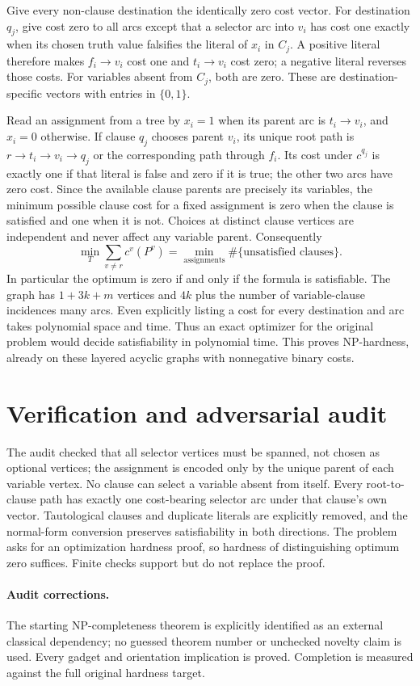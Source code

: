 \documentclass[11pt]{article}
\begin{document}
Give every non-clause destination the identically zero cost vector. For destination $q_j$, give cost zero to all arcs except that a selector arc into $v_i$ has cost one exactly when its chosen truth value falsifies the literal of $x_i$ in $C_j$. A positive literal therefore makes $f_i\to v_i$ cost one and $t_i\to v_i$ cost zero; a negative literal reverses those costs. For variables absent from $C_j$, both are zero. These are destination-specific vectors with entries in $\{0,1\}$.

Read an assignment from a tree by $x_i=1$ when its parent arc is $t_i\to v_i$, and $x_i=0$ otherwise. If clause $q_j$ chooses parent $v_i$, its unique root path is $r\to t_i\to v_i\to q_j$ or the corresponding path through $f_i$. Its cost under $c^{q_j}$ is exactly one if that literal is false and zero if it is true; the other two arcs have zero cost. Since the available clause parents are precisely its variables, the minimum possible clause cost for a fixed assignment is zero when the clause is satisfied and one when it is not. Choices at distinct clause vertices are independent and never affect any variable parent. Consequently
\[
\min_T\sum_{v\ne r}c^v(P^v)
=\min_{\text{assignments}}\#\{\text{unsatisfied clauses}\}.
\]
In particular the optimum is zero if and only if the formula is satisfiable. The graph has $1+3k+m$ vertices and $4k$ plus the number of variable-clause incidences many arcs. Even explicitly listing a cost for every destination and arc takes polynomial space and time. Thus an exact optimizer for the original problem would decide satisfiability in polynomial time. This proves NP-hardness, already on these layered acyclic graphs with nonnegative binary costs.

\section{Verification and adversarial audit}
The audit checked that all selector vertices must be spanned, not chosen as optional vertices; the assignment is encoded only by the unique parent of each variable vertex. No clause can select a variable absent from itself. Every root-to-clause path has exactly one cost-bearing selector arc under that clause's own vector. Tautological clauses and duplicate literals are explicitly removed, and the normal-form conversion preserves satisfiability in both directions. The problem asks for an optimization hardness proof, so hardness of distinguishing optimum zero suffices. Finite checks support but do not replace the proof.
\paragraph{Audit corrections.} The starting NP-completeness theorem is explicitly identified as an external classical dependency; no guessed theorem number or unchecked novelty claim is used. Every gadget and orientation implication is proved. Completion is measured against the full original hardness target.
\end{document}
